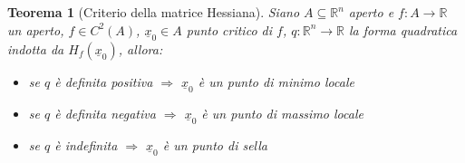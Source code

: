 \documentclass[12pt, a4paper]{article}
\theoremstyle{break}
\newtheorem{theorem}{Teorema} %
\begin{document}
\newpage
\begin{theorem} [Criterio della matrice Hessiana]
	Siano $A \subseteq \mathbb{R}^n$ aperto e $f: A \to \mathbb{R}$ un
	aperto, $f \in C^2(A)$, $\underline{x}_0 \in A$ punto critico di $f$, $q :
		\mathbb{R}^n \to \mathbb{R}$ la forma quadratica indotta da
	$H_f(\underline{x}_0)$, allora:
	\begin{itemize}
		\item se $q$ è definita positiva $\Rightarrow$ $\underline{x}_0$ è un
		      punto di minimo locale
		\item se $q$ è definita negativa $\Rightarrow$ $\underline{x}_0$ è un
		      punto di massimo locale
		\item se $q$ è indefinita $\Rightarrow$ $\underline{x}_0$ è un punto di
		      sella
	\end{itemize}
\end{theorem}
\end{document}
